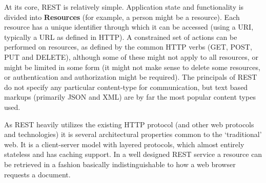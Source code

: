 \documentclass{article}
\begin{document}
At its core, REST is relatively simple. Application state and functionality is divided into \textbf{Resources} (for example, a person might be a resource). Each resource has a unique identifier through which it can be accessed (using a URI, typically a URL as defined in HTTP). A constrained set of actions can be performed on resources, as defined by the common HTTP verbs (GET, POST, PUT and DELETE), although some of these might not apply to all resources, or might be limited in some form (it might not make sense to delete some resources, or authentication and authorization might be required). The principals of REST do not specify any particular content-type for communication, but text based markups (primarily JSON and XML) are by far the most popular content types used.

As REST heavily utilizes the existing HTTP protocol (and other web protocols and technologies) it is several architectural properties common to the `traditional' web. It is a client-server model with layered protocols, which almost entirely stateless and has caching support. In a well designed REST service a resource can be retrieved in a fashion basically indistinguishable to how a web browser requests a document. 
\end{document}
